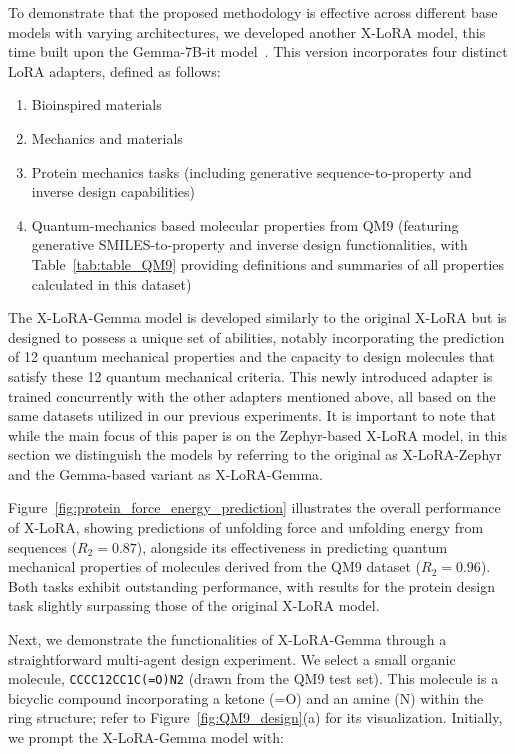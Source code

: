 To demonstrate that the proposed methodology is effective across different base models with varying architectures, we developed another X-LoRA model, this time built upon the Gemma-7B-it model~\cite{Google/gemma-7b-itFace}. This version incorporates four distinct LoRA adapters, defined as follows:

\begin{enumerate}
    \item Bioinspired materials \item Mechanics and materials \item Protein mechanics tasks (including generative sequence-to-property and inverse design capabilities) \item Quantum-mechanics based molecular properties from QM9 (featuring generative SMILES-to-property and inverse design functionalities, with Table~\ref{tab:table_QM9} providing definitions and summaries of all properties calculated in this dataset)~\cite{Ruddigkeit2012EnumerationGDB-17,Ramakrishnan2015ElectronicSpace}
\end{enumerate}

The X-LoRA-Gemma model is developed similarly to the original X-LoRA but is designed to possess a unique set of abilities, notably incorporating the prediction of 12 quantum mechanical properties and the capacity to design molecules that satisfy these 12 quantum mechanical criteria. This newly introduced adapter is trained concurrently with the other adapters mentioned above, all based on the same datasets utilized in our previous experiments. It is important to note that while the main focus of this paper is on the Zephyr-based X-LoRA model, in this section we distinguish the models by referring to the original as X-LoRA-Zephyr and the Gemma-based variant as X-LoRA-Gemma.

Figure~\ref{fig:protein_force_energy_prediction} illustrates the overall performance of X-LoRA, showing predictions of unfolding force and unfolding energy from sequences ($R_2 = 0.87$), alongside its effectiveness in predicting quantum mechanical properties of molecules derived from the QM9 dataset ($R_2 = 0.96$). Both tasks exhibit outstanding performance, with results for the protein design task slightly surpassing those of the original X-LoRA model.

Next, we demonstrate the functionalities of X-LoRA-Gemma through a straightforward multi-agent design experiment. We select a small organic molecule, \texttt{CCCC12CC1C(=O)N2} (drawn from the QM9 test set). This molecule is a bicyclic compound incorporating a ketone (=O) and an amine (N) within the ring structure; refer to Figure~\ref{fig:QM9_design}(a) for its visualization. Initially, we prompt the X-LoRA-Gemma model with:

